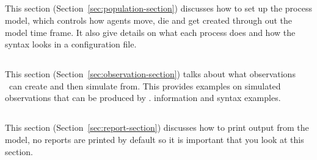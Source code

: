 \subsection{}
This section (Section~\ref{sec:population-section}) discusses how to set up the process model, which controls how agents move, die and get created through out the model time frame. It also give details on what each process does and how the syntax looks in a configuration file.

\subsection{}
This section (Section~\ref{sec:observation-section}) talks about what observations \IBM\ can create and then simulate from. This provides examples on simulated observations that can be produced by \IBM. information and syntax examples.

\subsection{}
This section (Section~\ref{sec:report-section}) discusses how to print output from the model, no reports are printed by default so it is important that you look at this section.

